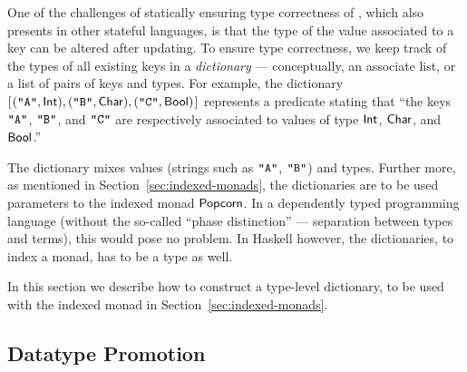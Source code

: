 One of the challenges of statically ensuring type correctness of \Redis{},
which also presents in other stateful languages, is that the type of the value
associated to a key can be altered after updating. To ensure type correctness,
we keep track of the types of all existing keys in a {\em dictionary} ---
conceptually, an associate list, or a list of pairs of keys and \Redis{} types.
For example, the dictionary \ensuremath{[\mskip1.5mu (\text{\tt \char34 A\char34},\Conid{Int}),(\text{\tt \char34 B\char34},\Conid{Char}),(\text{\tt \char34 C\char34},\Conid{Bool})\mskip1.5mu]} represents
a predicate stating that ``the keys \ensuremath{\text{\tt \char34 A\char34}}, \ensuremath{\text{\tt \char34 B\char34}}, and \ensuremath{\text{\tt \char34 C\char34}} are respectively
associated to values of type \ensuremath{\Conid{Int}}, \ensuremath{\Conid{Char}}, and \ensuremath{\Conid{Bool}}.''

The dictionary mixes values (strings such as \ensuremath{\text{\tt \char34 A\char34}}, \ensuremath{\text{\tt \char34 B\char34}}) and types. Further
more, as mentioned in Section~\ref{sec:indexed-monads}, the dictionaries are
to be used parameters to the indexed monad \ensuremath{\Conid{Popcorn}}. In a dependently typed
programming language (without the so-called ``phase distinction'' ---
separation between types and terms), this would pose no problem. In Haskell
however, the dictionaries, to index a monad, has to be a type as well.

In this section we describe how to construct a type-level dictionary, to be
used with the indexed monad in Section~\ref{sec:indexed-monads}.

\subsection{Datatype Promotion}

